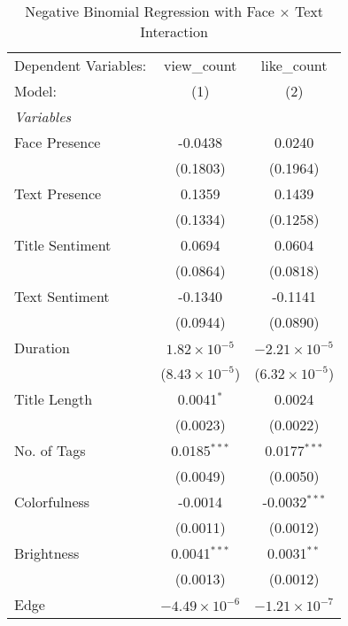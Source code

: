 
\begin{table}[htbp]
   \caption{Negative Binomial Regression with Face × Text Interaction}
   \centering
   \begin{tabular}{lcc}
      \tabularnewline \midrule \midrule
      Dependent Variables: & view\_count             & like\_count\\   
      Model:               & (1)                     & (2)\\  
      \midrule
      \emph{Variables}\\
      Face Presence        & -0.0438                 & 0.0240\\   
                           & (0.1803)                & (0.1964)\\   
      Text Presence        & 0.1359                  & 0.1439\\   
                           & (0.1334)                & (0.1258)\\   
      Title Sentiment      & 0.0694                  & 0.0604\\   
                           & (0.0864)                & (0.0818)\\   
      Text Sentiment       & -0.1340                 & -0.1141\\   
                           & (0.0944)                & (0.0890)\\   
      Duration             & $1.82\times 10^{-5}$    & $-2.21\times 10^{-5}$\\    
                           & ($8.43\times 10^{-5}$)  & ($6.32\times 10^{-5}$)\\    
      Title Length         & 0.0041$^{*}$            & 0.0024\\   
                           & (0.0023)                & (0.0022)\\   
      No. of Tags          & 0.0185$^{***}$          & 0.0177$^{***}$\\   
                           & (0.0049)                & (0.0050)\\   
      Colorfulness         & -0.0014                 & -0.0032$^{***}$\\   
                           & (0.0011)                & (0.0012)\\   
      Brightness           & 0.0041$^{***}$          & 0.0031$^{**}$\\   
                           & (0.0013)                & (0.0012)\\   
      Edge                 & $-4.49\times 10^{-6}$   & $-1.21\times 10^{-7}$\\    

\end{tabular}
\end{table}
